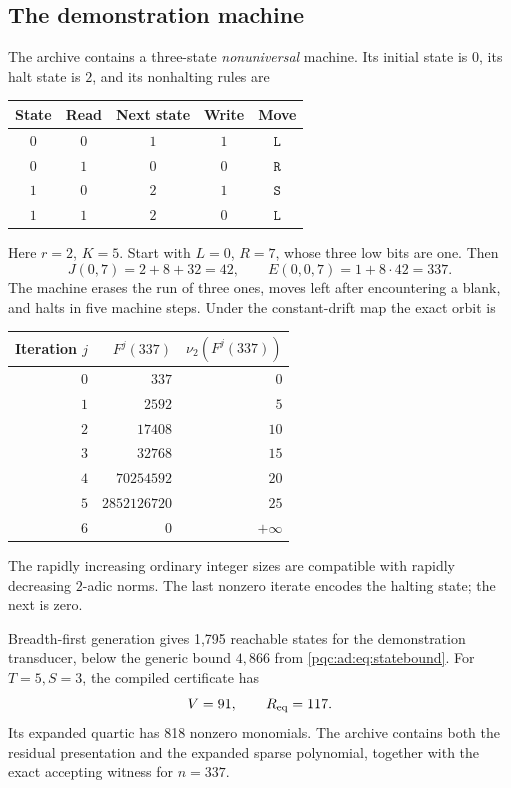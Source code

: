 \documentclass[11pt,letterpaper]{article}
\numberwithin{equation}{section}
\theoremstyle{definition}
\theoremstyle{remark}
\newcommand{\nuu}{\nu_2}
\newcommand{\blank}{\mathtt{S}}
\newcommand{\moveL}{\mathtt{L}}
\newcommand{\moveR}{\mathtt{R}}
\begin{document}
\subsection{The demonstration machine}
The archive contains a three-state \emph{nonuniversal} machine. Its initial
state is $0$, its halt state is $2$, and its nonhalting rules are
\begin{center}
\begin{tabular}{@{}ccccc@{}}
\toprule
State & Read & Next state & Write & Move\\
\midrule
$0$ & $0$ & $1$ & $1$ & $\moveL$\\
$0$ & $1$ & $0$ & $0$ & $\moveR$\\
$1$ & $0$ & $2$ & $1$ & $\blank$\\
$1$ & $1$ & $2$ & $0$ & $\moveL$\\
\bottomrule
\end{tabular}
\end{center}
Here $r=2$, $K=5$. Start with $L=0$, $R=7$, whose three low bits are one.
Then
\[
J(0,7)=2+8+32=42,\qquad E(0,0,7)=1+8\cdot42=337.
\]
The machine erases the run of three ones, moves left after encountering a
blank, and halts in five machine steps. Under the constant-drift map the
exact orbit is
\begin{center}
\begin{tabular}{@{}rrr@{}}
\toprule
Iteration $j$ & $F^j(337)$ & $\nuu(F^j(337))$\\
\midrule
$0$ & $337$ & $0$\\
$1$ & $2592$ & $5$\\
$2$ & $17408$ & $10$\\
$3$ & $32768$ & $15$\\
$4$ & $70254592$ & $20$\\
$5$ & $2852126720$ & $25$\\
$6$ & $0$ & $+\infty$\\
\bottomrule
\end{tabular}
\end{center}
The rapidly increasing ordinary integer sizes are compatible with rapidly
decreasing $2$-adic norms. The last nonzero iterate encodes the halting
state; the next is zero.

Breadth-first generation gives 1,795 reachable states for the demonstration
transducer, below the generic bound $4,866$ from
\eqref{pqc:ad:eq:statebound}. For $T=5,S=3$, the compiled certificate has
\[
V=91,\qquad R_{\rm eq}=117.
\]
Its expanded quartic has 818 nonzero monomials. The archive contains both
the residual presentation and the expanded sparse polynomial, together
with the exact accepting witness for $n=337$.
\end{document}
